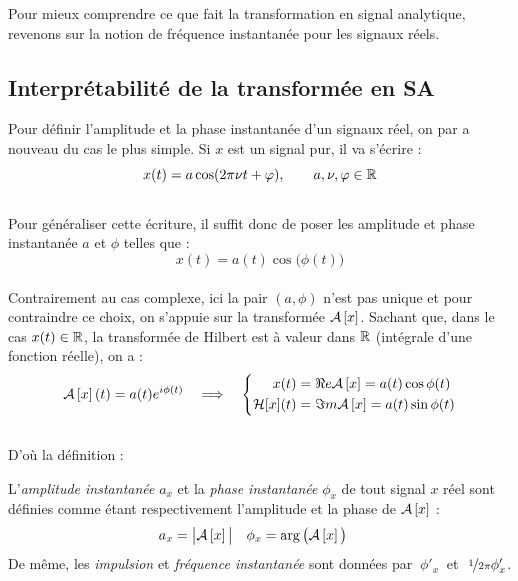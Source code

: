 Pour mieux comprendre ce que fait la transformation en signal analytique, revenons sur la notion de fréquence instantanée pour les signaux réels.
\\



\subsection{Interprétabilité de la transformée en SA}\label{sec:Bedrisan&AM-FM}

Pour définir l'amplitude et la phase instantanée d'un signaux réel, on par a nouveau du cas le plus simple. Si $x$ est un signal pur, il va s'écrire :
\[x(t) = a \cos(2\pi\nu t + \varphi),\qquad a,\nu,\varphi\in\mathbb{R}\]
\\
Pour généraliser cette écriture, il suffit donc de poser les amplitude et phase instantanée $a$ et $\phi$ telles que :
\[x(t) = a(t) \cos\big( \phi(t) \big)\]
\\
Contrairement au cas complexe, ici la pair $(a,\phi)$ n'est pas unique et pour contraindre ce choix, on s'appuie sur la transformée $\mathcal{A}\left[x\right]$. Sachant que, dans le cas $x(t)\in\mathbb{R}$, la transformée de Hilbert est à valeur dans $\mathbb{R}$ (intégrale d'une fonction réelle), on a :
\[\mathcal{A}\left[x\right](t) = a(t)e^{i\phi(t)}\quad \Longrightarrow\quad \left\{\begin{aligned}x(t) &= \Re e \mathcal{A}\left[x\right] = a(t) \cos\phi(t) \\ \mathcal{H}[x](t) &= \Im m \mathcal{A}\left[x\right] = a(t) \sin\phi(t)
\end{aligned}\right.\]
\\
D'où la définition :
\begin{definition}\label{def:ampli-phase_instant}
	L'\emph{amplitude instantanée} $a_x$ et la \emph{phase instantanée} $\phi_x$ de tout signal $x$ réel sont définies comme étant respectivement l'amplitude et la phase de $\mathcal{A}\left[x\right]$ :
	\begin{align}\label{eq:ampli-phase_instant}
		a_x &= \big|\mathcal{A}\left[x\right]\big|   &   \phi_x &= \arg\big(\mathcal{A}\left[x\right]\big)
	\end{align}
	De même, les \emph{impulsion} et \emph{fréquence instantanée} sont données par $\ \phi'_x\ $ et $\ \nicefrac{1}{2\pi}\phi_x'$.
\end{definition}
\skipl

